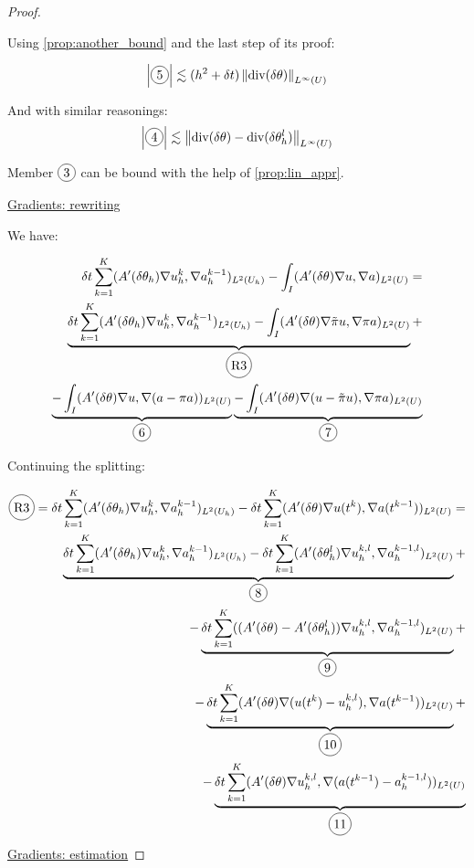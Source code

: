 \documentclass[english,a4paper,10pt,oneside]{scrbook}	%
\theoremstyle{break}
\newenvironment{mproof}[1][\proofname]{%
  \begin{proof}[#1]$ $\par\nobreak\ignorespaces
}{%
  \end{proof}
}
\renewcommand*{\proofname}{Proof}
\theoremstyle{remark}
\newcommand{\norm}[1]{\left\lVert#1\right\rVert}
\newcommand{\te}{\theta}
\newcommand{\dive}{\text{div}}
\newcommand*\circled[1]{\tikz[baseline=(char.base)]{
            \node[shape=circle,draw,inner sep=2pt] (char) {#1};}}
\begin{document}
\begin{mproof}
Using \cref{prop:another_bound} and the last step of its proof:

\begin{align*}
	\left |\circled{5}\right|\lesssim (h^2+\delta t)  \norm{\dive(\delta \te)}_{L^\infty(U)}
\end{align*}

And with similar reasonings:
\begin{align*}
	\left |\circled{4}\right|\lesssim \norm{\dive(\delta \te) - \dive(\delta \te_h^l)}_{L^\infty(U)}
\end{align*}

Member $\circled{3}$ can be bound with the help of \cref{prop:lin_appr}.

\underline{Gradients: rewriting}

We have:

\begin{align*}
	\delta t \sum_{k=1}^{K} (A'(\delta \theta_h ) \nabla u_h^k, \nabla a_h^{k-1})_{L^2(U_h)} - \int_I (A'(\delta\te )\nabla u, \nabla a)_{L^2(U)} = \\
	\underbrace{\delta t \sum_{k=1}^{K} (A'(\delta \theta_h ) \nabla u_h^k, \nabla a_h^{k-1})_{L^2(U_h)}- \int_I (A'(\delta\te )\nabla\tilde{\pi}u, \nabla \pi a)_{L^2(U)}}_{\circled{R3}} + \\\underbrace{- \int_I (A'(\delta\te )\nabla u, \nabla (a-\pi a))_{L^2(U)}}_{\circled{6}}\underbrace{- \int_I (A'(\delta\te )\nabla (u - \tilde{\pi}u), \nabla \pi a)_{L^2(U)}}_{\circled{7}} 
\end{align*}

Continuing the splitting:

\begin{align*}
\circled{R3} = \delta t \sum_{k=1}^{K} (A'(\delta \theta_h ) \nabla u_h^k, \nabla a_h^{k-1})_{L^2(U_h)} - \delta t \sum_{k=1}^{K} (A'(\delta\te )\nabla u(t^{k}) , \nabla a(t^{k-1}))_{L^2(U)} = \\
\underbrace{\delta t \sum_{k=1}^{K} (A'(\delta \theta_h ) \nabla u_h^k, \nabla a_h^{k-1})_{L^2(U_h)} - \delta t \sum_{k=1}^{K} (A'(\delta\te_h^l )\nabla u_h^{k,l} , \nabla a_h^{k-1,l})_{L^2(U)}}_{\circled{8}}+\\
- \underbrace{\delta t \sum_{k=1}^{K} ((A'(\delta \te) - A'(\delta\te_h^l ))\nabla u_h^{k,l} , \nabla a_h^{k-1,l})_{L^2(U)}}_{\circled{9}}+\\
- \underbrace{\delta t \sum_{k=1}^{K} (A'(\delta\te )\nabla (u(t^{k})-u_h^{k,l}) , \nabla a(t^{k-1}))_{L^2(U)}}_{\circled{10}}+\\
- \underbrace{\delta t \sum_{k=1}^{K} (A'(\delta\te )\nabla u_h^{k,l} , \nabla (a(t^{k-1}) -a_h^{k-1,l}))_{L^2(U)}}_{\circled{11}}
\end{align*}
\underline{Gradients: estimation}


\end{mproof}
\end{document}
